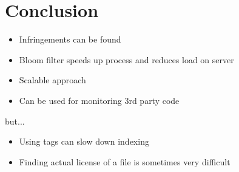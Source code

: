 
\section{Conclusion}

\begin{frame}{\insertsection}
	\begin{itemize}
		\item Infringements can be found
		\item Bloom filter speeds up process and reduces load on server
		\item Scalable approach
		\item Can be used for monitoring 3rd party code
	\end{itemize}
but...
	\begin{itemize}
		\item Using tags can slow down indexing
		\item Finding actual license of a file is sometimes very difficult
	\end{itemize}
\end{frame}